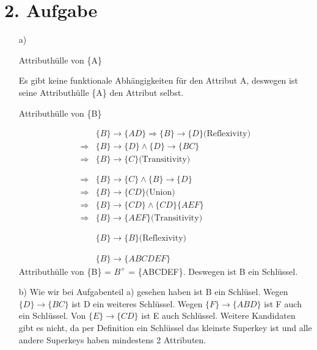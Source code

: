 \begin{itemize}
\end{itemize}

\section*{2. Aufgabe}

\begin{itemize}

\item[a)]

Attributhülle von \{A\}

Es gibt keine funktionale Abhängigkeiten für den Attribut A, deswegen ist seine Attributhülle \{A\} den Attribut selbst. 

Attributhülle von \{B\}

\begin{align*}
& \{B\} \rightarrow \{AD\} \Rightarrow \{B\} \rightarrow \{D\} \text{(Reflexivity)} \\
\Rightarrow & \{B\} \rightarrow \{D\} \land \{D\} \rightarrow \{BC\} \\
\Rightarrow & \{B\} \rightarrow \{C\} \text{(Transitivity)} \\ \\ \\
%
\Rightarrow & \{B\} \rightarrow \{C\} \land \{B\} \rightarrow \{D\} \\
\Rightarrow & \{B\} \rightarrow \{CD\} \text{(Union)} \\
\Rightarrow & \{B\} \rightarrow \{CD\} \land \{CD\} \{AEF\} \\
\Rightarrow & \{B\} \rightarrow \{AEF\} \text{(Transitivity)} \\ \\ \\
%
& \{B\} \rightarrow \{B\} \text{(Reflexivity)} \\ \\ \\
%
& \{B\} \rightarrow \{ABCDEF\}
\end{align*}
Attributhülle von \{B\} = $B^{+}$ = \{ABCDEF\}. Deswegen ist B ein Schlüssel. 

\item[b)]
Wie wir bei Aufgabenteil a) gesehen haben ist B ein Schlüsel.
Wegen $\{D\} \rightarrow \{BC\}$ ist D ein weiteres Schlüssel. Wegen $\{F\} \rightarrow \{ABD\}$ ist F auch ein Schlüssel. Von $\{E\} \rightarrow \{CD\}$ ist E auch Schlüssel. Weitere Kandidaten gibt es nicht, da per Definition ein Schlüssel das kleinste Superkey ist und alle andere Superkeys haben mindestens 2 Attributen.


\end{itemize}
